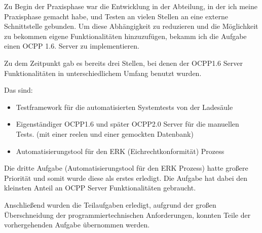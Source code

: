 Zu Begin der Praxisphase war die Entwicklung in der Abteilung, in der ich meine Praxisphase gemacht habe, und Testen an vielen Stellen an eine externe Schnittstelle gebunden.
Um diese Abhängigkeit zu reduzieren und die Möglichkeit zu bekommen eigene Funktionalitäten hinzuzufügen, bekamm ich die Aufgabe
einen OCPP 1.6. Server zu implementieren.

Zu dem Zeitpunkt gab es bereits drei Stellen, bei denen der OCPP1.6 Server Funktionalitäten in unterschiedlichem Umfang benutzt wurden.

Das sind:
\begin{itemize}
    \item Testframework für die automatisierten Systemtests von der Ladesäule
    \item Eigenständiger OCPP1.6 und später OCPP2.0 Server für die manuellen Tests. (mit einer reelen und einer gemockten Datenbank)
    \item Automatisierungstool für den ERK (Eichrechtkonformität) Prozess
\end{itemize}

Die dritte Aufgabe (Automatisierungstool für den ERK Prozess) hatte großere Priorität und somit wurde diese als erstes erledigt.
Die Aufgabe hat dabei den kleinsten Anteil an OCPP Server Funktionalitäten gebraucht.

Anschließend wurden die Teilaufgaben erledigt, aufgrund der großen Überschneidung der programmiertechnischen Anforderungen, 
konnten Teile der vorhergehenden Aufgabe übernommen werden.